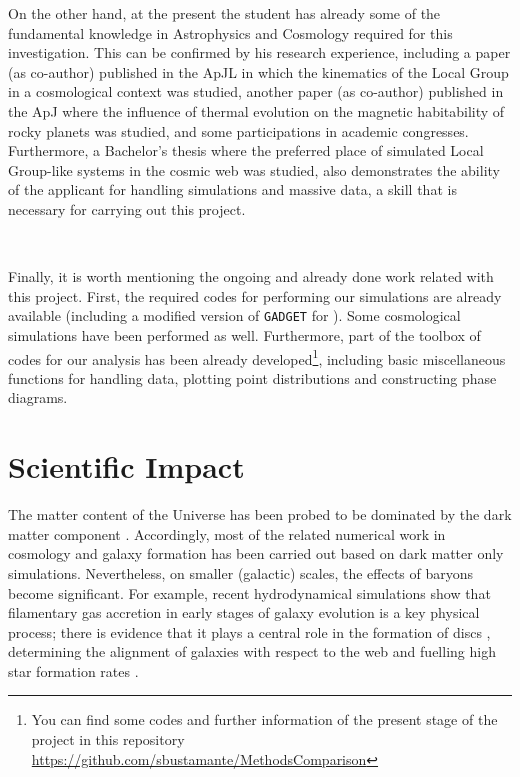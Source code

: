 \documentclass[a4,useAMS,usenatbib,usegraphicx,12pt]{article}
\begin{document}
On the other hand, at the present the student has already some of the fundamental 
knowledge in Astrophysics and Cosmology required for this investigation. This can 
be confirmed by his research experience, including a paper (as co-author) 
published in the ApJL in which the kinematics of the Local Group in a cosmological 
context was studied, another paper (as co-author) published in the ApJ where the 
influence of thermal evolution on the magnetic habitability of rocky planets was 
studied, and some participations in academic congresses. Furthermore, a Bachelor’s 
thesis where the preferred place of simulated Local Group-like systems in the 
cosmic web was studied, also demonstrates the ability of the applicant for 
handling simulations and massive data, a skill that is necessary for carrying out 
this project.

\

Finally, it is worth mentioning the ongoing and already done work related with 
this project. First, the required codes for performing our simulations are already
available (including a modified version of \texttt{GADGET} for \VPH). Some
cosmological simulations have been performed as well. Furthermore, part of the 
toolbox of codes for our analysis has been already developed\footnote{You can 
find some codes and further information of the present stage of the project in 
this repository \url{https://github.com/sbustamante/MethodsComparison}}, 
including basic miscellaneous functions for handling data, plotting point 
distributions and constructing phase diagrams.


\section{Scientific Impact}
The matter content of the Universe has been probed to be dominated by the dark 
matter component \citep{Planck13XVI}. Accordingly, most of the related numerical 
work in cosmology and galaxy formation has been carried out based on dark matter 
only simulations. Nevertheless, on smaller (galactic) scales, the effects of 
baryons become significant. For example, recent hydrodynamical simulations show 
that filamentary gas accretion in early stages of galaxy evolution is a key 
physical process; there is evidence that it plays a central role in the formation 
of discs \citep{Dubois14}, determining the alignment of galaxies with respect to 
the web \citep{Hahn10} and fuelling high star formation rates \citep{Dekel09}.
\end{document}
